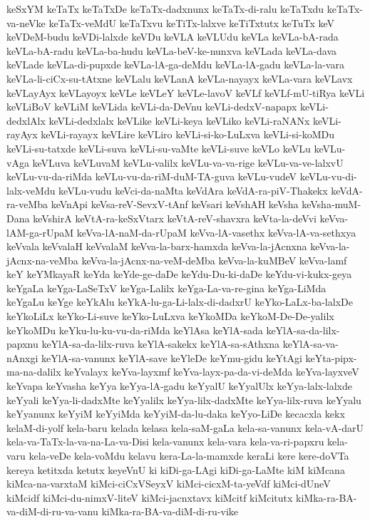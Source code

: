 {keSxYM
keTaTx
keTaTxDe
keTaTx-dadxnunx
keTaTx-di-ralu
keTaTxdu
keTaTx-va-neVke
keTaTx-veMdU
keTaTxvu
keTiTx-lalxve
keTiTxtutx
keTuTx
keV
keVDeM-budu
keVDi-lalxde
keVDu
keVLA
keVLUdu
keVLa
keVLa-bA-rada
keVLa-bA-radu
keVLa-ba-hudu
keVLa-beV-ke-nunxva
keVLada
keVLa-dava
keVLade
keVLa-di-pupxde
keVLa-lA-ga-deMdu
keVLa-lA-gadu
keVLa-la-vara
keVLa-li-ciCx-su-tAtxne
keVLalu
keVLanA
keVLa-nayayx
keVLa-vara
keVLavx
keVLayAyx
keVLayoyx
keVLe
keVLeY
keVLe-lavoV
keVLf
keVLf-mU-tiRya
keVLi
keVLiBoV
keVLiM
keVLida
keVLi-da-DeVnu
keVLi-dedxV-napapx
keVLi-dedxlAlx
keVLi-dedxlalx
keVLike
keVLi-keya
keVLiko
keVLi-raNANx
keVLi-rayAyx
keVLi-rayayx
keVLire
keVLiro
keVLi-si-ko-LuLxva
keVLi-si-koMDu
keVLi-su-tatxde
keVLi-suva
keVLi-su-vaMte
keVLi-suve
keVLo
keVLu
keVLu-vAga
keVLuva
keVLuvaM
keVLu-valilx
keVLu-va-va-rige
keVLu-va-ve-lalxvU
keVLu-vu-da-riMda
keVLu-vu-da-riM-duM-TA-guva
keVLu-vudeV
keVLu-vu-di-lalx-veMdu
keVLu-vudu
keVci-da-naMta
keVdAra
keVdA-ra-piV-Thakekx
keVdA-ra-veMba
keVnApi
keVsa-reV-SevxV-tAnf
keVsari
keVshAH
keVsha
keVsha-muM-Dana
keVshirA
keVtA-ra-keSxVtarx
keVtA-reV-shavxra
keVta-la-deVvi
keVva-lAM-ga-rUpaM
keVva-lA-naM-da-rUpaM
keVva-lA-vasethx
keVva-lA-va-sethxya
keVvala
keVvalaH
keVvalaM
keVva-la-barx-hamxda
keVva-la-jAcnxna
keVva-la-jAcnx-na-veMba
keVva-la-jAcnx-na-veM-deMba
keVva-la-kuMBeV
keVva-lamf
keY
keYMkayaR
keYda
keYde-ge-daDe
keYdu-Du-ki-daDe
keYdu-vi-kukx-geya
keYgaLa
keYga-LaSeTxV
keYga-Lalilx
keYga-La-va-re-gina
keYga-LiMda
keYgaLu
keYge
keYkAlu
keYkA-lu-ga-Li-lalx-di-dadxrU
keYko-LaLx-ba-lalxDe
keYkoLiLx
keYko-Li-suve
keYko-LuLxva
keYkoMDa
keYkoM-De-De-yalilx
keYkoMDu
keYku-lu-ku-vu-da-riMda
keYlAsa
keYlA-sada
keYlA-sa-da-lilx-papxnu
keYlA-sa-da-lilx-ruva
keYlA-sakekx
keYlA-sa-sAthxna
keYlA-sa-va-nAnxgi
keYlA-sa-vanunx
keYlA-save
keYleDe
keYmu-gidu
keYtAgi
keYta-pipx-ma-na-dalilx
keYvalayx
keYva-layxmf
keYva-layx-pa-da-vi-deMda
keYva-layxveV
keYvapa
keYvasha
keYya
keYya-lA-gadu
keYyalU
keYyalUlx
keYya-lalx-lalxde
keYyali
keYya-li-dadxMte
keYyalilx
keYya-lilx-dadxMte
keYya-lilx-ruva
keYyalu
keYyanunx
keYyiM
keYyiMda
keYyiM-da-lu-daka
keYyo-LiDe
kecacxla
kekx
kelaM-di-yolf
kela-baru
kelada
kelasa
kela-saM-gaLa
kela-sa-vanunx
kela-vA-darU
kela-va-TaTx-la-va-na-La-va-Disi
kela-vanunx
kela-vara
kela-va-ri-papxru
kela-varu
kela-veDe
kela-voMdu
kelavu
kera-La-la-mamxde
keraLi
kere
kere-doVTa
kereya
ketitxda
ketutx
keyeVnU
ki
kiDi-ga-LAgi
kiDi-ga-LaMte
kiM
kiMcana
kiMca-na-varxtaM
kiMci-ciCxVSeyxV
kiMci-cicxM-ta-yeVdf
kiMci-dUneV
kiMcidf
kiMci-du-nimxV-liteV
kiMci-jacnxtavx
kiMcitf
kiMcitutx
kiMka-ra-BA-va-diM-di-ru-va-vanu
kiMka-ra-BA-va-diM-di-ru-vike
}
